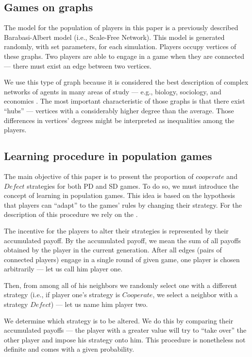\documentclass[english, twoside, 12pt, a4paper]{article}
\theoremstyle{definition}
\theoremstyle{plain}
\theoremstyle{remark}
\begin{document}
\subsection{Games on graphs}

The model for the population of players in this paper is a previously described Barabasi-Albert model (i.e., Scale-Free Network). This model is generated randomly, with set parameters, for each simulation. Players occupy vertices of these graphs. Two players are able to engage in a game when they are connected --- there must exist an edge between two vertices. 

We use this type of graph because it is considered the best description of complex networks of agents in many areas of study --- e.g., biology, sociology, and economics \citep{volchenkov2002epidemic}. The most important characteristic of those graphs is that there exist \enquote{hubs} --- vertices with a considerably higher degree than the average. Those differences in vertices' degrees might be interpreted as inequalities among the players. 

\subsection{Learning procedure in population games}

The main objective of this paper is to present the proportion of $cooperate$ and $Defect$ strategies for both PD and SD games. To do so, we must introduce the concept of learning in population games. This idea is based on the hypothesis that players can \enquote{adapt} to the games' rules by changing their strategy. For the description of this procedure we rely on the \cite{santos2005scale}. 

The incentive for the players to alter their strategies is represented by their accumulated payoff. By the accumulated payoff, we mean the sum of all payoffs obtained by the player in the current generation. 
After all edges (pairs of connected players) engage in a single round of given game, one player is chosen arbitrarily --- let us call him player one. 

Then, from among all of his neighbors we randomly select one with a different strategy (i.e., if player one's strategy is $Cooperate$, we select a neighbor with a strategy $Defect$) --- let us name him player two.

We determine which strategy is to be altered. We do this by comparing their accumulated payoffs --- the player with a greater value will try to \enquote{take over} the other player and impose his strategy onto him. This procedure is nonetheless not definite and comes with a given probability. 
\end{document}
